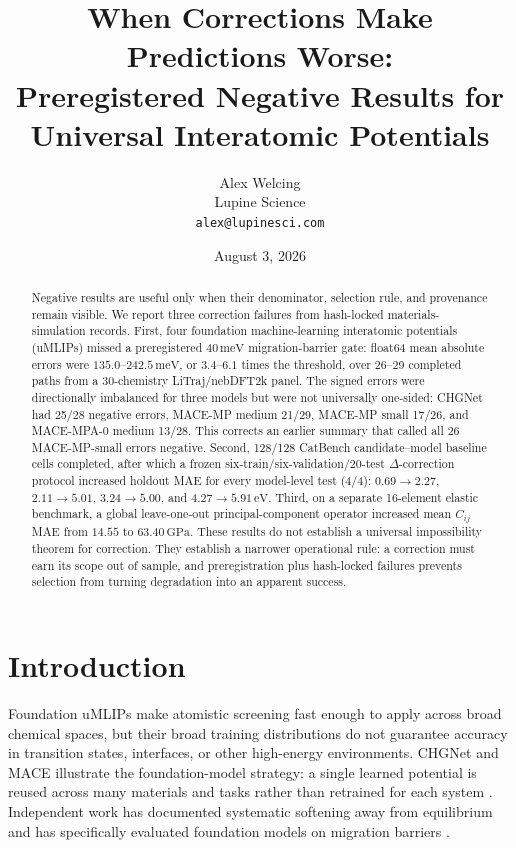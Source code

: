 \documentclass[11pt]{article}
\title{When Corrections Make Predictions Worse:\\Preregistered Negative Results for Universal Interatomic Potentials}
\author{Alex Welcing\\Lupine Science\\\texttt{alex@lupinesci.com}}
\date{August 3, 2026}
\newcommand{\eV}{\,\mathrm{eV}}
\newcommand{\meV}{\,\mathrm{meV}}
\newcommand{\GPa}{\,\mathrm{GPa}}
\begin{document}
\maketitle

\begin{abstract}
Negative results are useful only when their denominator, selection rule, and provenance remain visible. We report three correction failures from hash-locked materials-simulation records. First, four foundation machine-learning interatomic potentials (uMLIPs) missed a preregistered $40\meV$ migration-barrier gate: float64 mean absolute errors were $135.0$--$242.5\meV$, or $3.4$--$6.1$ times the threshold, over 26--29 completed paths from a 30-chemistry LiTraj/nebDFT2k panel. The signed errors were directionally imbalanced for three models but were not universally one-sided: CHGNet had 25/28 negative errors, MACE-MP medium 21/29, MACE-MP small 17/26, and MACE-MPA-0 medium 13/28. This corrects an earlier summary that called all 26 MACE-MP-small errors negative. Second, 128/128 CatBench candidate--model baseline cells completed, after which a frozen six-train/six-validation/20-test $\Delta$-correction protocol increased holdout MAE for every model-level test (4/4): $0.69\rightarrow2.27$, $2.11\rightarrow5.01$, $3.24\rightarrow5.00$, and $4.27\rightarrow5.91\eV$. Third, on a separate 16-element elastic benchmark, a global leave-one-out principal-component operator increased mean $C_{ij}$ MAE from $14.55$ to $63.40\GPa$. These results do not establish a universal impossibility theorem for correction. They establish a narrower operational rule: a correction must earn its scope out of sample, and preregistration plus hash-locked failures prevents selection from turning degradation into an apparent success.
\end{abstract}

\section{Introduction}

Foundation uMLIPs make atomistic screening fast enough to apply across broad chemical spaces, but their broad training distributions do not guarantee accuracy in transition states, interfaces, or other high-energy environments. CHGNet and MACE illustrate the foundation-model strategy: a single learned potential is reused across many materials and tasks rather than retrained for each system \citep{deng2023chgnet,batatia2024mace}. Independent work has documented systematic softening away from equilibrium \citep{deng2025softening} and has specifically evaluated foundation models on migration barriers \citep{bheemaguli2026barriers}.
\end{document}
